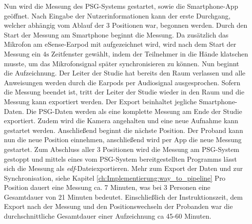 Nun wird die Messung des PSG-Systems gestartet, sowie die Smartphone-App geöffnet. 
Nach Eingabe der Nutzerinformationen kann der erste Durchgang, welcher abhängig vom Ablauf der 3 Positionen war, begonnen werden.
Durch den Start der Messung am Smartphone beginnt die Messung. 
Da zusätzlich das Mikrofon am eSense-Earpod mit aufgezeichnet wird, wird nach dem Start der Messung ein $4\si{\s}$ Zeitfenster gewählt, indem der Teilnehmer in die Hände klatschen musste, um das Mikrofonsignal später synchronisieren zu können.
Nun beginnt die Aufzeichnung. Der Leiter der Studie hat bereits den Raum verlassen und alle Anweisungen werden durch die Earpods per Audiosignal ausgesprochen. 
Sofern die Messung beendet ist, tritt der Leiter der Studie wieder in den Raum und die Messung kann exportiert werden. 
Der Export beinhaltet jegliche Smartphone-Daten. Die PSG-Daten werden als eine komplette Messung am Ende der Studie exportiert.
Zudem wird die Kamera angehalten und eine neue Aufnahme kann gestartet werden.
Anschließend beginnt die nächste Position. Der Proband kann nun die neue Position einnehmen, anschließend wird per App die neue Messung gestartet.
Zum Abschluss aller 3 Positionen wird die Messung am PSG-System gestoppt und mittels eines vom PSG-System bereitgestellten Programms lässt sich die Messung als \glqq \textit{edf}-Datei\grqq exportieren.
Mehr zum Export der Daten und zur Synchronisation, siehe Kapitel \ref{ch:Implementierung:way_to_pipeline}
Pro Position dauert eine Messung ca. 7 Minuten, was bei 3 Personen eine Gesamtdauer von 21 Minuten bedeutet.
Einschließlich der Instruktionszeit, dem Export nach der Messung und den Positionswechseln der Probanden war die durchschnittliche Gesamtdauer einer Aufzeichnung ca 45-60 Minuten. 